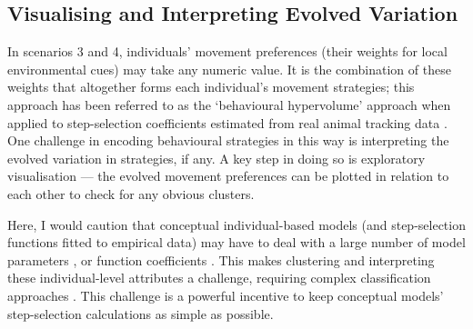 \begin{interludeenv}
\subsection*{Visualising and Interpreting Evolved Variation}

In scenarios 3 and 4, individuals' movement preferences (their weights for local environmental cues) may take any numeric value.
It is the combination of these weights that altogether forms each individual's movement strategies; this approach has been referred to as the `behavioural hypervolume' approach when applied to step-selection coefficients estimated from real animal tracking data \parencite{bastille-rousseau2019}.
One challenge in encoding behavioural strategies in this way is interpreting the evolved variation in strategies, if any.
A key step in doing so is exploratory visualisation --- the evolved movement preferences can be plotted in relation to each other to check for any obvious clusters.

Here, I would caution that conceptual individual-based models (and step-selection functions fitted to empirical data) may have to deal with a large number of model parameters \parencite{mueller2011}, or function coefficients \parencite{bastille-rousseau2019}.
This makes clustering and interpreting these individual-level attributes a challenge, requiring complex classification approaches \parencite{bastille-rousseau2019}.
This challenge is a powerful incentive to keep conceptual models' step-selection calculations as simple as possible.


\end{interludeenv}
